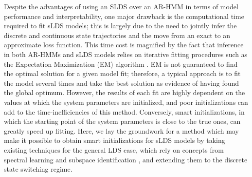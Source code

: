 Despite the advantages of using an SLDS over an AR-HMM in terms of model performance and interpretability, one major drawback is the computational time required to fit sLDS models; this is largely due to the need to jointly infer the discrete and continuous state trajectories and the move from an exact to an approximate loss function. This time cost is magnified by the fact that inference in both AR-HMMs and sLDS models relies on iterative fitting procedures such as the Expectation Maximization (EM) algorithm \cite{baum_maximization_1970, dempster_maximum_1977, shumway_approach_1982, bishop_pattern_2006, escola_hidden_2011}. EM is not guaranteed to find the optimal solution for a given model fit; therefore, a typical approach is to fit the model several times and take the best solution as evidence of having found the global optimum. However, the results of each fit are highly dependent on the values at which the system parameters are initialized, and poor initializations can add to the time-inefficiencies of this method. Conversely, smart initializations, in which the starting point of the system parameters is close to the true ones, can greatly speed up fitting. Here, we lay the groundwork for a method which may make it possible to obtain smart initializations for sLDS models by taking existing techniques for the general LDS case, which rely on concepts from spectral learning \cite{martens_learning_2010, anandkumar_tensor_2014, belanger_linear_2015, hazan_learning_2017, hazan_spectral_2018} and subspace identification \cite{ho_editorial_1966, van_overschee_n4sid_1994, viberg_subspace-based_1995, van_overschee_subspace_1996, qin_overview_2006}, and extending them to the discrete state switching regime. 
